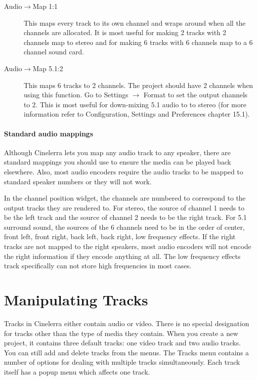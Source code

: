     \begin{description}
        \item[Audio$\rightarrow$Map 1:1] This maps every track to its own channel and wraps around when all the channels are allocated. It is most useful for making 2 tracks with 2 channels map to stereo and for making 6 tracks with 6 channels map to a 6 channel sound card.
        \item[Audio$\rightarrow$Map 5.1:2] This maps 6 tracks to 2 channels. The project should have 2 channels when using this function. Go to Settings $\rightarrow$ Format to set the output channels to 2. This is most useful for down-mixing 5.1 audio to to stereo (for more information refer to Configuration, Settings and Preferences chapter 15.1).
    \end{description}

\paragraph{Standard audio mappings} Although Cinelerra lets you map any audio track to any speaker, there are standard mappings you should use to ensure the media can be played back elsewhere. Also, most audio encoders require the audio tracks to be mapped to standard speaker numbers or they will not work.

In the channel position widget, the channels are numbered to correspond to the output tracks they are rendered to. For stereo, the source of channel 1 needs to be the left track and the source of channel 2 needs to be the right track.  For 5.1 surround sound, the sources of the 6 channels need to be in the order of center, front left, front right, back left, back right, low frequency effects. If the right tracks are not mapped to the right speakers, most audio encoders will not encode the right information if they encode anything at all. The low frequency effects track specifically can not store high frequencies in
most cases.

\section{Manipulating Tracks}%
\label{sec:manipulating_tracks}

Tracks in Cinelerra either contain audio or video.  There is no special designation for tracks other than the type of media they contain.  When you create a new project, it contains three default tracks: one video track and two audio tracks.  You can still add and delete tracks from the menus.  The Tracks menu contains a number of options for dealing with multiple tracks simultaneously.  Each track itself has a popup menu which affects one track. 

